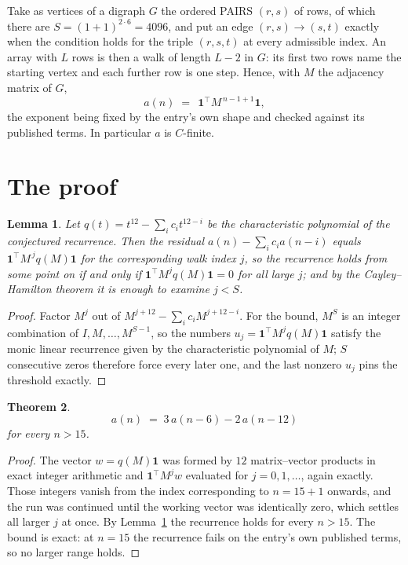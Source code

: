 \documentclass[11pt,a4paper]{article}
\theoremstyle{plain}
\newtheorem{theorem}{Theorem}
\newtheorem{lemma}[theorem]{Lemma}
\theoremstyle{definition}
\begin{document}
Take as vertices of a digraph $G$ the ordered PAIRS $(r,s)$ of rows, of which there are
$S=(1+1)^{2\cdot6}=4096$, and put an edge $(r,s)\to(s,t)$ exactly when the condition
holds for the triple $(r,s,t)$ at every admissible index. An array with $L$ rows is then a
walk of length $L-2$ in $G$: its first two rows name the starting vertex and each further
row is one step. Hence, with $M$ the adjacency matrix of $G$,
\[
a(n)\;=\;\,\mathbf{1}^{\!\top}M^{\,n-1+1}\mathbf{1},
\]
the exponent being fixed by the entry's own shape and checked against its published terms.
In particular $a$ is $C$-finite.

\section{The proof}

\begin{lemma}\label{lem:crit}
Let $q(t)=t^{12}-\sum_i c_it^{12-i}$ be the characteristic polynomial of the
conjectured recurrence. Then the residual $a(n)-\sum_ic_ia(n-i)$ equals
$\mathbf{1}^{\!\top}M^{\,j}q(M)\mathbf{1}$ for the corresponding walk index
$j$, so the recurrence holds from some point on if and only if
$\mathbf{1}^{\!\top}M^{j}q(M)\mathbf{1}=0$ for all large $j$; and by the
Cayley--Hamilton theorem it is enough to examine $j<S$.
\end{lemma}

\begin{proof}
Factor $M^{j}$ out of $M^{j+12}-\sum_ic_iM^{j+12-i}$. For the bound, $M^{S}$
is an integer combination of $I,M,\dots,M^{S-1}$, so the numbers
$u_j=\mathbf{1}^{\!\top}M^{j}q(M)\mathbf{1}$ satisfy the monic linear recurrence given by
the characteristic polynomial of $M$; $S$ consecutive zeros therefore force every later one,
and the last nonzero $u_j$ pins the threshold exactly.
\end{proof}

\begin{theorem}
\[
a(n)\;=\;3\,a(n-6) - 2\,a(n-12)
\]
for every $n>15$.
\end{theorem}

\begin{proof}
The vector $w=q(M)\mathbf{1}$ was formed by $12$ matrix--vector products in exact
integer arithmetic and $\mathbf{1}^{\!\top}M^{j}w$ evaluated for $j=0,1,\dots$, again
exactly. Those integers vanish from the index corresponding to $n=15+1$ onwards, and the
run was continued until the working vector was identically zero, which settles all larger $j$
at once. By Lemma~\ref{lem:crit} the recurrence holds for every $n>15$. The bound is exact: at $n=15$ the recurrence fails on the entry's own published terms, so no larger range holds.
\end{proof}
\end{document}
